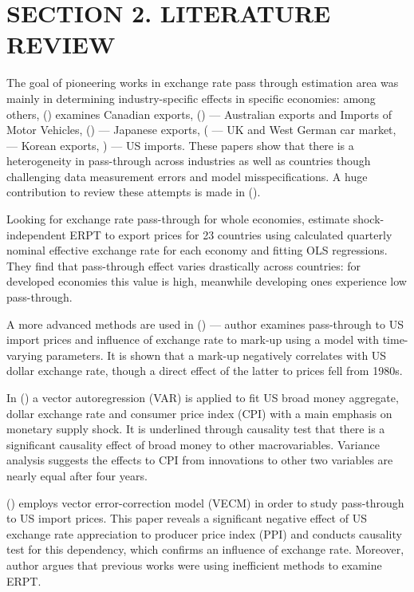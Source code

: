 \documentclass[12pt, a4paper]{extarticle}
\begin{document}
\newpage
\section*{SECTION 2. LITERATURE REVIEW}
\setcounter{section}{2}
The goal of pioneering works in exchange rate pass through estimation area was mainly in determining industry-specific effects in specific economies: among others, (\cite{Schembri1985}) examines Canadian exports, (\cite{Menon1992, Menon1993}) --- Australian exports and Imports of Motor Vehicles, (\cite{Khosla1991, Athukorala1994}) --- Japanese exports, (\cite{Cowling1989} --- UK and West German car market, \cite{Athukorala1991} --- Korean exports, \cite{Baldwin1988, Feenstra1989, Hooper1989}) --- US imports. These papers show that there is a heterogeneity in pass-through across industries as well as countries though challenging data measurement errors and model misspecifications. A huge contribution to review these attempts is made in (\cite{Menon1993, Menon1995}).

Looking for exchange rate pass-through for whole economies, \textcite{Khosla1989} estimate shock-independent ERPT to export prices for 23 countries using calculated quarterly nominal effective exchange rate for each economy and fitting OLS regressions. They find that pass-through effect varies drastically across countries: for developed economies this value is high, meanwhile developing ones experience low pass-through.

A more advanced methods are used in (\cite{Kim1990}) --- author examines pass-through to US import prices and influence of exchange rate to mark-up using a model with time-varying parameters. It is shown that a mark-up negatively correlates with US dollar exchange rate, though a direct effect of the latter to prices fell from 1980s. 

In (\cite{Deravi1995}) a vector autoregression (VAR) is applied to fit US broad money aggregate, dollar exchange rate and consumer price index (CPI) with a main emphasis on monetary supply shock. It is underlined through causality test that there is a significant causality effect of broad money to other macrovariables. Variance analysis suggests the effects to CPI from innovations to other two variables are nearly equal after four years.
 
(\cite{Kim1998}) employs vector error-correction model (VECM) in order to study pass-through to US import prices. This paper reveals a significant negative effect of US exchange rate appreciation to producer price index (PPI) and conducts causality test for this dependency, which confirms an influence of exchange rate. Moreover, author argues that previous works were using inefficient methods to examine ERPT. 
\end{document}
